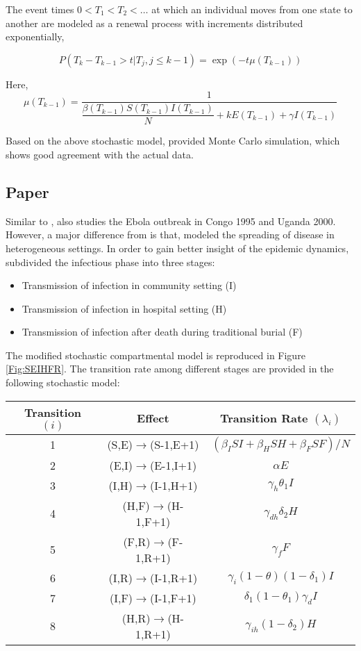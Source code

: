 \documentclass[12pt, journal,onecolumn]{IEEEtran}
\begin{document}
The event times $0<T_1<T_2<\ldots$ at which an individual moves from one state to another are modeled as a renewal process with increments distributed exponentially,

\begin{equation}
P(T_k-T_{k-1} > t | T_j, j\leq k-1) = \exp(-t \mu (T_{k-1}) )
\end{equation}

Here, 
\[
\mu (T_{k-1}) = \frac{1}{\dfrac{\beta(T_{k-1}) S(T_{k-1}) I(T_{k-1})}{N} + k E(T_{k-1}) + \gamma I(T_{k-1})}
\]

Based on the above stochastic model, \cite{chowell2004basic} provided Monte Carlo simulation, which shows good agreement with the actual data.

\subsection{Paper \cite{legrand2007understanding}}
Similar to \cite{chowell2004basic}, \cite{legrand2007understanding} also studies the Ebola outbreak in Congo 1995 and Uganda 2000. However, a major difference from \cite{chowell2004basic} is that, \cite{legrand2007understanding} modeled the spreading of disease in heterogeneous settings. In order to gain better insight of the epidemic dynamics, \cite{legrand2007understanding} subdivided the infectious phase into three stages:

\begin{itemize}
\item Transmission of infection in community setting (I)
\item Transmission of infection in hospital setting (H)
\item Transmission of infection after death during traditional burial (F)
\end{itemize}

The modified stochastic compartmental model is reproduced in Figure \ref{Fig:SEIHFR}. The transition rate among different stages are provided in the following stochastic model:

\begin{center}
\begin{tabular}{|c|c|c|}
\hline 
Transition $(i)$ & Effect & Transition Rate $(\lambda_i)$ \tabularnewline
\hline 
\hline 
1 & (S,E)$\to$(S-1,E+1) & $(\beta_{I}SI+\beta_{H}SH+\beta_{F}SF)/N$\tabularnewline
\hline 
2 & (E,I)$\to$(E-1,I+1) & $\alpha E$\tabularnewline
\hline 
3 & (I,H)$\to$(I-1,H+1) & $\gamma_{h}\theta_{1}I$\tabularnewline
\hline 
4 & (H,F)$\to$(H-1,F+1) & $\gamma_{dh}\delta_{2}H$\tabularnewline
\hline 
5 & (F,R)$\to$(F-1,R+1) & $\gamma_{f}F$\tabularnewline
\hline 
6 & (I,R)$\to$(I-1,R+1) & $\gamma_{i}(1-\theta)(1-\delta_{1})I$\tabularnewline
\hline 
7 & (I,F)$\to$(I-1,F+1) & $\delta_{1}(1-\theta_{1})\gamma_{d}I$\tabularnewline
\hline 
8 & (H,R)$\to$(H-1,R+1) & $\gamma_{ih}(1-\delta_{2})H$\tabularnewline
\hline 
\end{tabular}
\end{center}
\end{document}
